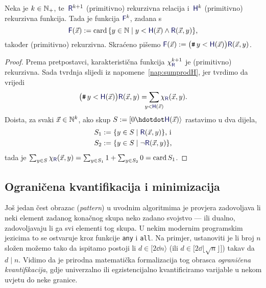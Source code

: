 \begin{lema}[{name=[ograničeno brojenje čuva (primitivnu) rekurzivnost]}]\label{lm:brojrek}
Neka je $k\in{\mathbb N}_+$, te\, $\f R^{k+1}$ (primitivno) rekurzivna relacija i\, $\f H^k$ (primitivno) rekurzivna funkcija. Tada je funkcija $\f F^k$, zadana s
\begin{equation}
    \f F(\vec x):=\card\,\{y\in\N\mid y<\f H(\vec x)\land\f R(\vec x,y)\}\text,
\end{equation}
također (primitivno) rekurzivna. Skraćeno pišemo $\f F(\vec x):=\bigl(\num y<\f H(\vec x)\bigr)\f R(\vec x,y)$.
\end{lema}
\begin{proof}
    Prema pretpostavci, karakteristična funkcija $\chi_{\f R}^{k+1}$ je (primitivno) rekurzivna. Sada tvrdnja slijedi iz napomene~\ref{nap:sumprodH}, jer tvrdimo da vrijedi
    \begin{equation}
        \bigl(\num y<\f H(\vec x)\bigr)\f R(\vec x,y)=\sum_{\mathclap{y<\f H(\vec x)}}\chi_{\f R}(\vec x,y)\text.
    \end{equation}
    Doista, za svaki $\vec x\in{\mathbb N}^k$, ako skup $S:=[0\dd \f H(\vec x)\rangle$ rastavimo u dva dijela,
    \begin{align}
        S_1&:=\{y\in S\mid\f R(\vec x,y)\}\text{, i}\\
        S_2&:=\{y\in S\mid\lnot\f R(\vec x,y)\}\text,
    \end{align}
    tada je
        $\sum_{y\in S}\chi_{\f R}(\vec x,y)=\sum_{y\in S_1}1+\sum_{y\in S_2}0=\card S_1$.
\end{proof}

\subsection{Ograničena kvantifikacija i minimizacija}

Još jedan čest obrazac (\emph{pattern}) u uvodnim algoritmima je provjera zadovoljava li neki element zadanog konačnog skupa neko zadano svojstvo --- ili dualno, zadovoljavaju li ga svi elementi tog skupa. U nekim modernim programskim jezicima to se ostvaruje kroz funkcije \texttt{any} i \texttt{all}. Na primjer, ustanoviti je li broj $n$ složen možemo tako da ispitamo postoji li $d\in[2\dd n\rangle$ (ili $d\in\bigl[2\dd \lfloor\!\sqrt{n}\rfloor\bigr]$) takav da $d\mathrel|n$. Vidimo da je prirodna matematička formalizacija tog obrasca \emph{ograničena kvantifikacija}, gdje univerzalno ili egzistencijalno kvantificiramo varijable u nekom uvjetu do neke granice.

